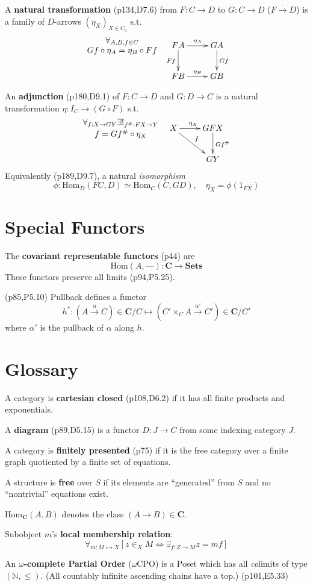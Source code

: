 \documentclass[10pt,twocolumn,letterpaper]{article}
\newcommand{\paren}[1]{\left({#1}\right)}
\newcommand{\brak}[1]{\left[{#1}\right]}
\newcommand{\defn}[1]{{\bf #1}}
\begin{document}
  A \defn{natural transformation} (p134,D7.6) from $F : C \to D$ to $G : C \to D$ ($F
  \stackrel{\cdot}{\to} D$) is a family of $D$-arrows $\paren{\eta_X}_{X \in C_0}$ s.t.
  \[\xymatrix{
     {}\save[]+<-1cm,0cm>*\txt<8pc>{$\forall_{A,B,f \in C}$\\$Gf\circ \eta_A = \eta_B\circ Ff$}\restore
      & FA \ar[r]^{\eta_A} \ar[d]_{Ff} & GA \ar[d]^{Gf} \\
      & FB \ar[r]^{\eta_B}             & GB} \]

  An \defn{adjunction} (p180,D9.1) of $F : C \to D$ and $G : D \to C$ is a natural
  transformation $\eta : I_C \stackrel{\cdot}{\to} (G\circ F)$ s.t.
  \[\xymatrix{
     {}\save[]+<-1cm,0cm>*\txt<8pc>{$\forall_{f:X \to GY}\exists!_{f^\#:FX\to Y}$\\
                                    $f = Gf^\# \circ \eta_X$}\restore
      & X \ar[dr]^f \ar[r]^{\eta_X} & GFX \ar[d]^{Gf^\#} \\
      & & GY
  }\]
  Equivalently (p189,D9.7), a natural {\em isomorphism}
  \[ \phi : \mbox{Hom}_D(FC,D) \simeq \mbox{Hom}_C(C,GD), \quad \eta_X = \phi(1_{FX}) \]

\section{Special Functors}

  The \defn{covariant representable functors} (p44) are
     \[\mbox{Hom}(A,\text{---}) : \mathbf{C} \to \mathbf{Sets}\]
  These functors preserve all limits (p94,P5.25).

  (p85,P5.10) Pullback defines a functor
    \[ h^* : (A \stackrel{\alpha}{\to} C) \in \mathbf{C}/C
       \mapsto (C' \times_C A \stackrel{\alpha'}{\to} C') \in \mathbf{C}/C' \]
    where $\alpha'$ is the pullback of $\alpha$ along $h$.

\section{Glossary}

  A category is \defn{cartesian closed} (p108,D6.2) if it has all finite
  products and exponentials.

  A \defn{diagram} (p89,D5.15) is a functor $D : J \to C$ from
     some indexing category $J$.

  A category is \defn{finitely presented} (p75) if it is the
  free category over a finite graph quotiented by a finite set of equations.

  A structure is \defn{free} over $S$ if its elements are ``generated''
  from $S$ and no ``nontrivial'' equations exist.

  $\mbox{Hom}_\mathbf{C}(A,B)$ denotes the class $(A \to B) \in \mathbf{C}$.

  Subobject $m$'s \defn{local membership relation}:
          \[ \forall_{m : M \rightarrowtail X}
             \brak{ z \in_X M \Leftrightarrow \exists_{f:Z \to M} z = mf} \]

  An \defn{$\omega$-complete Partial Order} ($\omega$CPO) is a Poset which
    has all {\em co}limits of type $(\mathbb{N},\le)$.  (All countably
    infinite ascending chains have a top.) (p101,E5.33)
\end{document}
